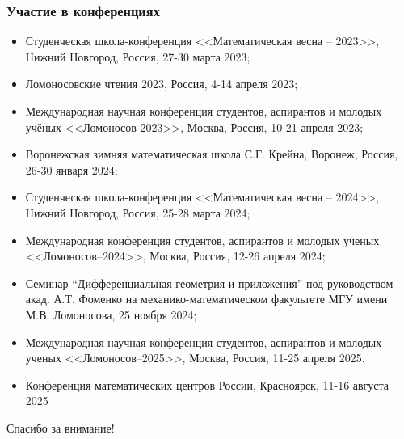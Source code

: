 \begin{frame}[t,allowframebreaks]
    \frametitle{Участие в конференциях}
    \begin{itemize}%
\item Студенческая школа-конференция <<Математическая весна --  2023>>, Нижний Новгород, Россия, 27-30 марта 2023;
\item Ломоносовские чтения 2023, Россия, 4-14 апреля 2023;
\item {} Международная научная конференция студентов, аспирантов и молодых учёных <<Ломоносов-2023>>,  Москва, Россия, 10-21 апреля 2023;
\item Воронежская зимняя математическая школа С.Г. Крейна, Воронеж, Россия, 26-30 января 2024;
\item Студенческая школа-конференция <<Математическая весна -- 2024>>, Нижний Новгород, Россия, 25-28 марта 2024;
\item {} Международная конференция студентов, аспирантов и молодых ученых <<Ломоносов--2024>>, Москва, Россия, 12-26 апреля 2024;
\item Семинар “Дифференциальная геометрия и приложения” под руководством акад. А.Т. Фоменко на механико-математическом факультете МГУ имени М.В. Ломоносова, 25 ноября 2024;
\item {} Международная научная конференция студентов, аспирантов и молодых ученых <<Ломоносов--2025>>, Москва, Россия, 11-25 апреля 2025.
\item {} Конференция математических центров России, Красноярск, 11-16 августа 2025
\end{itemize}

\end{frame}

\begin{frame} %
    \begin{center}
        \Huge
        Спасибо за внимание!
    \end{center}
\end{frame}
